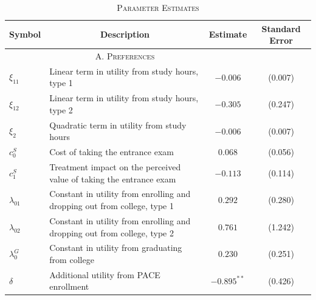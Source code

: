 \renewcommand{\arraystretch}{1.0}
\begin{table}[H]\centering
\footnotesize
\caption{\textsc{Parameter Estimates}\label{tab:modelestimates}}
\begin{tabular}{l*{1}{lcc}}
\hline
Symbol & \multicolumn{1}{c}{Description} & Estimate & Standard Error\\
\hline
 & \multicolumn{1}{c}{\textsc{A. Preferences}} & &\\
$\xi_{11}$ & Linear term in utility from study hours, type 1  & $-0.006$ & (0.007) \\
$\xi_{12}$ & Linear term in utility from study hours, type 2& $-0.305$ & (0.247) \\
$\xi_2$ & Quadratic term in utility from study hours & $-0.006$ & (0.007) \\
$c_0^S$ & Cost of taking the entrance exam & $0.068$ & (0.056) \\
$c_1^S$ &Treatment impact on the perceived value of taking the entrance exam & $-0.113$ & (0.114) \\
$\lambda_{01}$ & Constant in utility from enrolling and dropping out from college, type 1   & $0.292$ & (0.280) \\
$\lambda_{02}$ & Constant in utility from enrolling and dropping out from college, type 2   & $0.761$ & (1.242) \\
$\lambda^{G}_{0}$ & Constant in utility from graduating from college & $0.230$ & (0.251) \\
$\delta$ & Additional utility from PACE enrollment & $-0.895^{**}$ & (0.426) \\ %





\end{tabular}
\end{table}
